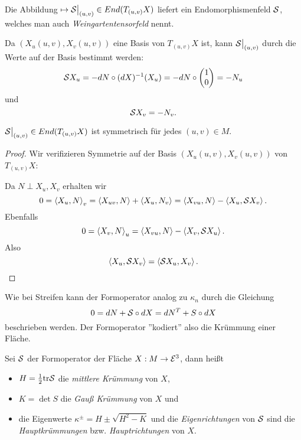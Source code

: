 \begin{remark}
	Die Abbildung $\mapsto \mathcal S \big|_{(u,v)} \in End(T_{(u,v)}X)$ liefert ein Endomorphismenfeld $\mathcal S$, welches man auch \emph{Weingartentensorfeld} nennt.
\end{remark}

\begin{remark}
	Da $\left( X_u(u,v) , X_v(u,v) \right)$ eine Basis von $T_{(u,v)}X$ ist, kann $\mathcal S \big|_{(u,v)}$ durch die Werte auf der Basis bestimmt werden:
	\[ \mathcal S X_u = -dN \circ (dX)^{-1}(X_u)= 
	-dN \circ \begin{pmatrix} 1\\0 \end{pmatrix} = -N_u \]
	und 
	\[ \mathcal S X_v = -N_v. \]
\end{remark}

\begin{lemma}
	$\mathcal S \big|_{(u,v)} \in End(T_{(u,v)}X)$ ist symmetrisch für jedes $(u,v) \in M$.
\end{lemma}

\begin{proof}
	Wir verifizieren Symmetrie auf der Basis $(X_u(u,v),X_v(u,v))$ von $T_{(u,v)}X$:
	
	Da $N \perp X_u,X_v$ erhalten wir 
	\[ 0=\left \langle X_u,N \right\rangle_v = \left \langle X_{uv}, N \right\rangle + \left \langle X_u,N_v \right\rangle
	= \left \langle X_{vu},N \right\rangle- \left \langle X_u,\mathcal S X_v \right\rangle. \]
	Ebenfalls
	\[ 0=\left \langle X_v,N \right\rangle_u 
	= \left \langle X_{vu},N \right\rangle- \left \langle X_v, \mathcal S X_u \right\rangle. \]
	Also 
	\[ \left \langle X_u,\mathcal S X_v \right\rangle = \left \langle \mathcal S X_u,X_v \right\rangle. \]
\end{proof}


\begin{remark}
	Wie bei Streifen kann der Formoperator analog zu $\kappa_n$ durch die Gleichung 
	\[ 0=dN + \mathcal S \circ dX = dN^T + S\circ dX \] beschrieben werden.
	Der Formoperator ''kodiert'' also die Krümmung einer Fläche.
\end{remark}

\begin{definition}
	Sei $\mathcal S$ der Formoperator der Fläche $X : M \to \mathcal E^3$, dann heißt
	\begin{itemize}
		\item $H=\frac 12 \mathrm{tr} \mathcal S $ die \emph{mittlere Krümmung} von $X$,
		\item $K=\det S$ die \emph{Gauß Krümmung} von $X$ und 
		\item die Eigenwerte $\kappa^\pm = H \pm \sqrt{H^2-K}$ und die \emph{Eigenrichtungen} von $\mathcal S$ sind die \emph{Hauptkrümmungen} bzw. \emph{Hauptrichtungen} von $X$. 
	\end{itemize}
\end{definition}

